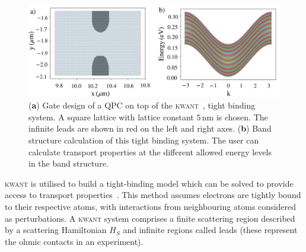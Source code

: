 \begin{figure}[!bht]
 \begin{center}
 \includegraphics[width=1.0\textwidth]{figures/appendix/appendix2_kwant.pdf}
 \caption[\textsc{kwant} : Tight Binding Model and Band Structure]{\label{fig:appx/kwant_tightbind} 
 (\textbf{a}) Gate design of a QPC on top of the \textsc{kwant}~\cite{kwant}, tight binding system. A square lattice with lattice constant $5\,\mathrm{nm}$ is chosen. The infinite leads are shown in red on the left and right axes. (\textbf{b}) Band structure calculation of this tight binding system. The user can calculate transport properties at the different allowed energy levels in the band structure.}
 \end{center}
\end{figure}





\textsc{kwant} is utilised to build a tight-binding model which can be solved to provide access to transport properties~\cite{kwant}. This method assumes electrons are tightly bound to their respective atoms, with interactions from neighbouring atoms considered as perturbations. A \textsc{kwant} system comprises a finite scattering region described by a scattering Hamiltonian $H_S$ and infinite regions called leads (these represent the ohmic contacts in an experiment).


